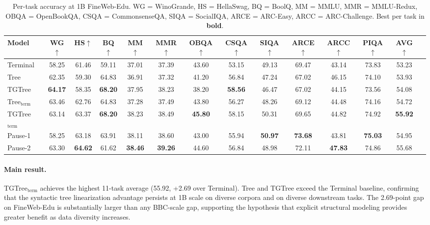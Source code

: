 \documentclass[11pt]{article}
\begin{document}
\begin{table}[htbp]
  \centering
  \setlength{\tabcolsep}{1.5pt}
  \begin{tabular}{lccccccccccccc}
    \toprule
    Model & WG$\uparrow$ & HS$\uparrow$ & BQ$\uparrow$ & MM$\uparrow$ & MMR$\uparrow$ & OBQA$\uparrow$ & CSQA$\uparrow$ & SIQA$\uparrow$ & ARCE$\uparrow$ & ARCC$\uparrow$ & PIQA$\uparrow$ & \textbf{AVG}$\uparrow$ \\
    \midrule
    Terminal & 58.25 & 61.46 & 59.11 & 37.01 & 37.39 & 43.60 & 53.15 & 49.13 & 69.47 & 43.14 & 73.83 & 53.23 \\
    Tree & 62.35 & 59.30 & 64.83 & 36.91 & 37.32 & 41.20 & 56.84 & 47.24 & 67.02 & 46.15 & 74.10 & 53.93 \\
    TGTree & \textbf{64.17} & 58.35 & \textbf{68.20} & 37.95 & 38.23 & 38.20 & \textbf{58.56} & 46.47 & 67.02 & 44.15 & 73.56 & 54.08 \\
    Tree$_{\text{term}}$ & 63.46 & 62.76 & 64.83 & 37.28 & 37.49 & 43.80 & 56.27 & 48.26 & 69.12 & 44.48 & 74.16 & 54.72 \\
    TGTree$_{\text{term}}$ & 63.14 & 63.37 & \textbf{68.20} & 38.23 & 38.49 & \textbf{45.80} & 58.15 & 50.31 & 69.65 & 44.82 & 74.92 & \textbf{55.92} \\
    Pause-1 & 58.25 & 63.18 & 63.91 & 38.11 & 38.60 & 43.00 & 55.94 & \textbf{50.97} & \textbf{73.68} & 43.81 & \textbf{75.03} & 54.95 \\
    Pause-2 & 63.30 & \textbf{64.62} & 61.62 & \textbf{38.46} & \textbf{39.26} & 44.60 & 56.84 & 48.98 & 72.11 & \textbf{47.83} & 74.86 & 55.68 \\
    \bottomrule
  \end{tabular}
  \caption{Per-task accuracy at 1B FineWeb-Edu. WG = WinoGrande, HS = HellaSwag, BQ = BoolQ, MM = MMLU, MMR = MMLU-Redux, OBQA = OpenBookQA, CSQA = CommonsenseQA, SIQA = SocialIQA, ARCE = ARC-Easy, ARCC = ARC-Challenge. Best per task in \textbf{bold}. }
  \label{tab:main-result}
\end{table}

\paragraph{Main result.}
TGTree$_{\text{term}}$ achieves the highest 11-task average (55.92, +2.69 over Terminal).
Tree and TGTree exceed the Terminal baseline, confirming that the syntactic tree linearization advantage persists at 1B scale on diverse corpora and on diverse downstream tasks.
The 2.69-point gap on FineWeb-Edu is substantially larger than any BBC-scale gap, supporting the hypothesis that explicit structural modeling provides greater benefit as data diversity increases.
\end{document}
